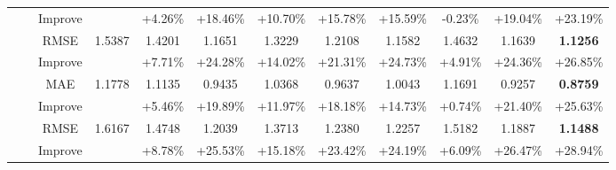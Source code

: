 \begin{table}[t]
{\begin{tabular}{|c|c|c||c|c|c|c|c|c||c|c||c|}
\multirow{16}{*}{} &\multirow{4}{*}{}& {Improve} & {} & {+4.26\%} & {+18.46\%} & {+10.70\%} & {+15.78\%}  & {+15.59\%} & {-0.23\%} &{+19.04\%} & {+23.19\%} \\
\cline{3-12}
\multirow{16}{*}{} &\multirow{4}{*}{}& {RMSE}    & {1.5387} & {1.4201}   &{1.1651} & {1.3229}   & {1.2108}   &  {1.1582}   & {1.4632}  & {1.1639}  &{\textbf{1.1256}}\\
\multirow{16}{*}{} &\multirow{4}{*}{}& {Improve} & {} & {+7.71\%} & {+24.28\%} & {+14.02\%} & {+21.31\%}  & {+24.73\%} & {+4.91\%} &{+24.36\%} & {+26.85\%} \\
\cline{2-12}
\multirow{16}{*}{} &\multirow{4}{*}{}\multirow{4}{*}{60\%} & {MAE}& {1.1778} & {1.1135}   &{0.9435} & {1.0368}   & {0.9637}   &  {1.0043}   & {1.1691}  & {0.9257}  &{\textbf{0.8759}}\\
\multirow{16}{*}{} &\multirow{4}{*}{}& {Improve} & {} & {+5.46\%} & {+19.89\%} & {+11.97\%} & {+18.18\%}  & {+14.73\%} & {+0.74\%} &{+21.40\%} & {+25.63\%} \\
\cline{3-12}
\multirow{16}{*}{} &\multirow{4}{*}{}& {RMSE}    & {1.6167} & {1.4748}   &{1.2039} & {1.3713}   & {1.2380}   &  {1.2257}   & {1.5182}   & {1.1887}  &{\textbf{1.1488}}\\
\multirow{16}{*}{} &\multirow{4}{*}{}& {Improve} & {} & {+8.78\%} & {+25.53\%} & {+15.18\%} & {+23.42\%}  & {+24.19\%} & {+6.09\%} &{+26.47\%} & {+28.94\%} \\
\hline
\end{tabular}}
\end{table}

